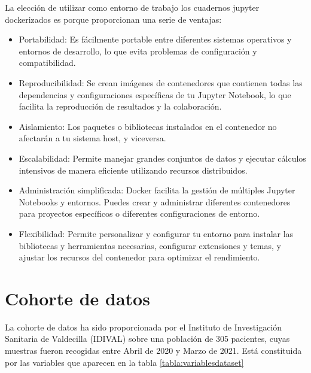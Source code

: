 La elección de utilizar como entorno de trabajo los cuadernos jupyter dockerizados es porque proporcionan una serie de ventajas:
\begin{itemize}
    \item Portabilidad: Es fácilmente portable entre diferentes sistemas operativos y entornos de desarrollo, lo que evita problemas de configuración y compatibilidad.
    \item Reproducibilidad: Se crean imágenes de contenedores que contienen todas las dependencias y configuraciones específicas de tu Jupyter Notebook, lo que facilita la reproducción de resultados y la colaboración.
    \item Aislamiento: Los paquetes o bibliotecas instalados en el contenedor no afectarán a tu sistema host, y viceversa.
    \item Escalabilidad: Permite manejar grandes conjuntos de datos y ejecutar cálculos intensivos de manera eficiente utilizando recursos distribuidos.
    \item Administración simplificada: Docker facilita la gestión de múltiples Jupyter Notebooks y entornos. Puedes crear y administrar diferentes contenedores para proyectos específicos o diferentes configuraciones de entorno.
    \item Flexibilidad: Permite personalizar y configurar tu entorno para instalar las bibliotecas y herramientas necesarias, configurar extensiones y temas, y ajustar los recursos del contenedor para optimizar el rendimiento.
\end{itemize}

\section{Cohorte de datos}

La cohorte de datos ha sido proporcionada por el Instituto de Investigación Sanitaria de Valdecilla (IDIVAL) sobre una población de 305 pacientes, cuyas muestras fueron recogidas entre Abril de 2020 y Marzo de 2021. Está constituida por las variables que aparecen en la tabla \ref{tabla:variablesdataset}

